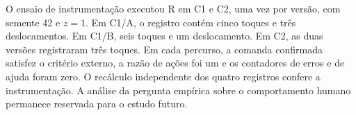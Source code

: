 O ensaio de instrumentação executou R em C1 e C2, uma vez por versão, com semente 42 e $z=1$. Em C1/A, o registro contém cinco toques e três deslocamentos. Em C1/B, seis toques e um deslocamento. Em C2, as duas versões registraram três toques. Em cada percurso, a comanda confirmada satisfez o critério externo, a razão de ações foi um e os contadores de erros e de ajuda foram zero. O recálculo independente dos quatro registros confere a instrumentação. A análise da pergunta empírica sobre o comportamento humano permanece reservada para o estudo futuro.
